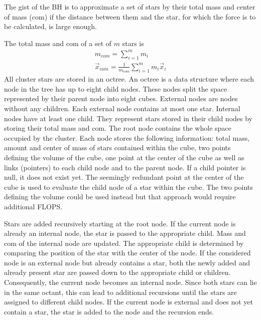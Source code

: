 \documentclass[letterpaper,10pt,english]{sphinxmanual}
\begin{document}
				\sphinxAtStartPar
				The gist of the BH is to approximate a set of stars by their total mass and center of mass (com) if the distance between them
				and the star, for which the force is to be calculated, is large enough.
				
				\sphinxAtStartPar
				The total mass and com of a set of \(m\) stars is
				\begin{equation*}
				\begin{split}m_{com} = \sum_{i=1}^mm_i \\
				\vec{x}_{com} = \frac{1}{m_{com}}\sum_{i=1}^mm_i\vec{x}_i\end{split}
				\end{equation*}
				\sphinxAtStartPar
				All cluster stars are stored in an octree.
				An octree is a data structure where each node in the tree has up to eight child nodes.
				These nodes split the space represented by their parent node into eight cubes.
				External nodes are nodes without any children. Each external node contains at most one star.
				Internal nodes have at least one child. They represent stars stored in their child nodes by storing their total mass and com.
				The root node contains the whole space occupied by the cluster. Each node stores the following information: total mass, amount and center of mass of stars
				contained within the cube, two points defining the volume of the cube, one point at the center of the cube as well as links (pointers) to each child node and to the parent node.
				If a child pointer is null, it does not exist yet.
				The seemingly redundant point at the center of the cube is used to evaluate the child node of a star within the cube.
				The two points defining the volume could be used instead but that approach would require additional FLOPS.
				
				\sphinxAtStartPar
				Stars are added recursively starting at the root node. If the current node is already an internal node, the star is passed
				to the appropriate child. Mass and com of the internal node are updated.
				The appropriate child is determined by comparing the position of the star with the center of the node.
				If the considered node is an external node but already contains a star,
				both the newly added and already present star are passed down to the appropriate child or children.
				Consequently, the current node becomes an internal node.
				Since both stars can lie in the same octant, this can lead to additional recursions until the stars are assigned to different child nodes.
				If the current node is external and does not yet contain a star, the star is added to the node and the recursion ends.
				
\end{document}
